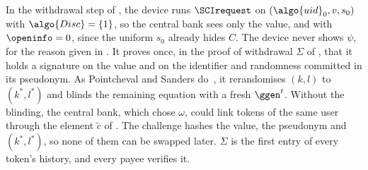 In the withdrawal step of , the device runs $\SCIrequest$ on
$(\algo{uid}_0, v, s_0)$ with $\algo{Disc} = \{1\}$, so the central bank sees
only the value, and with $\openinfo = 0$, since the uniform $s_0$ already hides
$C$. The device never shows $\psi$, for the reason given in
. It proves once, in the proof of withdrawal
$\Sigma$ of , that it holds a signature on the value and on
the identifier and randomness committed in its pseudonym. As Pointcheval and
Sanders do~\cite{RSA:PoiSan16}, it rerandomises $(k, l)$ to $(k^*, l^*)$ and
blinds the remaining equation with a fresh $\ggen^{t}$. Without the blinding,
the central bank, which chose $\omega$, could link tokens of the same user
through the element $\tilde{c}$ of . The challenge hashes the value, the pseudonym and $(k^*,
l^*)$, so none of them can be swapped later. $\Sigma$ is the first entry of
every token's history, and every payee verifies it.

